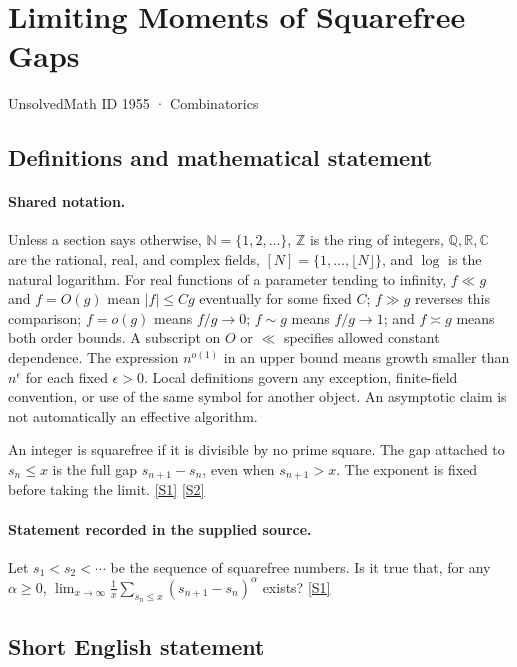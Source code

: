 \documentclass[11pt,a4paper]{article}
\newcommand{\N}{\mathbb{N}}
\newcommand{\Z}{\mathbb{Z}}
\newcommand{\Q}{\mathbb{Q}}
\newcommand{\R}{\mathbb{R}}
\newcommand{\C}{\mathbb{C}}
\newcommand{\sref}[2]{\hyperlink{source:#1:#2}{[S#2]}}
\begin{document}

\setcounter{section}{1954}

\section{Limiting Moments of Squarefree Gaps}\label{1955}

{\small\sffamily UnsolvedMath ID 1955 · Combinatorics}

\subsection{Definitions and mathematical statement}

\paragraph{Shared notation.}Unless a section says otherwise, $\N=\{1,2,\ldots\}$,
$\Z$ is the ring of integers, $\Q,\R,\C$ are the rational, real, and complex
fields, $[N]=\{1,\ldots,\lfloor N\rfloor\}$, and $\log$ is the natural
logarithm. For real functions of a parameter tending to infinity,
$f\ll g$ and $f=O(g)$ mean $|f|\leq Cg$ eventually for some fixed $C$;
$f\gg g$ reverses this comparison; $f=o(g)$ means $f/g\to0$;
$f\sim g$ means $f/g\to1$; and $f\asymp g$ means both order bounds.
A subscript on $O$ or $\ll$ specifies allowed constant dependence.
The expression $n^{o(1)}$ in an upper bound means growth smaller than
$n^\epsilon$ for each fixed $\epsilon>0$. Local definitions govern any
exception, finite-field convention, or use of the same symbol for another
object. An asymptotic claim is not automatically an effective algorithm.



An integer is squarefree if it is divisible by no prime square. The gap attached to $s_n\leq x$ is the full gap $s_{n+1}-s_n$, even when $s_{n+1}>x$. The exponent is fixed before taking the limit. \sref{1955}{1} \sref{1955}{2}

\paragraph{Statement recorded in the supplied source.}
Let $s_1<s_2<\cdots$ be the sequence of squarefree numbers. Is it true that, for any $\alpha \geq 0$, $ \lim_{x\to \infty}\frac{1}{x}\sum_{s_n\leq x}(s_{n+1}-s_n)^\alpha $ exists? \sref{1955}{1}

\subsection{Short English statement}
\end{document}
